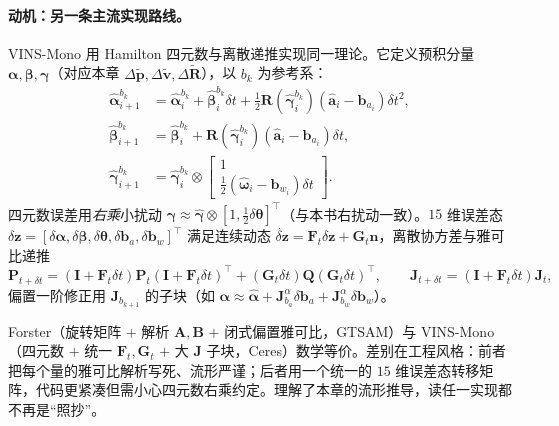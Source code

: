 \paragraph{动机：另一条主流实现路线。}
VINS-Mono 用 Hamilton 四元数与离散递推实现同一理论\cite{qin2018vins}。它定义预积分量 $\boldsymbol\alpha,\boldsymbol\beta,\boldsymbol\gamma$（对应本章 $\Delta\tilde{\mathbf p},\Delta\tilde{\mathbf v},\Delta\tilde{\mathbf R}$），以 $b_k$ 为参考系：
\begin{align}
  \hat{\boldsymbol\alpha}^{b_k}_{i+1}&=\hat{\boldsymbol\alpha}^{b_k}_i+\hat{\boldsymbol\beta}^{b_k}_i\delta t+\tfrac12\mathbf R(\hat{\boldsymbol\gamma}^{b_k}_i)(\hat{\mathbf a}_i-\mathbf b_{a_i})\delta t^2,\nonumber\\
  \hat{\boldsymbol\beta}^{b_k}_{i+1}&=\hat{\boldsymbol\beta}^{b_k}_i+\mathbf R(\hat{\boldsymbol\gamma}^{b_k}_i)(\hat{\mathbf a}_i-\mathbf b_{a_i})\delta t,\label{eq:vins-prop}\\
  \hat{\boldsymbol\gamma}^{b_k}_{i+1}&=\hat{\boldsymbol\gamma}^{b_k}_i\otimes\begin{bmatrix}1\\\tfrac12(\hat{\boldsymbol\omega}_i-\mathbf b_{w_i})\delta t\end{bmatrix}.\nonumber
\end{align}
四元数误差用\emph{右乘}小扰动 $\boldsymbol\gamma\approx\hat{\boldsymbol\gamma}\otimes[1,\tfrac12\delta\boldsymbol\theta]^\top$（与本书右扰动一致）。$15$ 维误差态 $\delta\mathbf z=[\delta\boldsymbol\alpha,\delta\boldsymbol\beta,\delta\boldsymbol\theta,\delta\mathbf b_a,\delta\mathbf b_w]^\top$ 满足连续动态 $\dot{\delta\mathbf z}=\mathbf F_t\delta\mathbf z+\mathbf G_t\mathbf n$，离散协方差与雅可比递推
\begin{equation}
  \mathbf P_{t+\delta t}=(\mathbf I+\mathbf F_t\delta t)\mathbf P_t(\mathbf I+\mathbf F_t\delta t)^\top+(\mathbf G_t\delta t)\mathbf Q(\mathbf G_t\delta t)^\top,\qquad
  \mathbf J_{t+\delta t}=(\mathbf I+\mathbf F_t\delta t)\mathbf J_t,
  \label{eq:vins-cov}
\end{equation}
偏置一阶修正用 $\mathbf J_{b_{k+1}}$ 的子块（如 $\boldsymbol\alpha\approx\hat{\boldsymbol\alpha}+\mathbf J^\alpha_{b_a}\delta\mathbf b_a+\mathbf J^\alpha_{b_w}\delta\mathbf b_w$）。

\begin{insight}[两条路线殊途同归]\label{ins:two-routes}
Forster（旋转矩阵 $+$ 解析 $\mathbf A,\mathbf B$ $+$ 闭式偏置雅可比，GTSAM）与 VINS-Mono（四元数 $+$ 统一 $\mathbf F_t,\mathbf G_t$ $+$ 大 $\mathbf J$ 子块，Ceres）数学等价。差别在工程风格：前者把每个量的雅可比解析写死、流形严谨；后者用一个统一的 $15$ 维误差态转移矩阵，代码更紧凑但需小心四元数右乘约定。理解了本章的流形推导，读任一实现都不再是“照抄”。
\end{insight}

